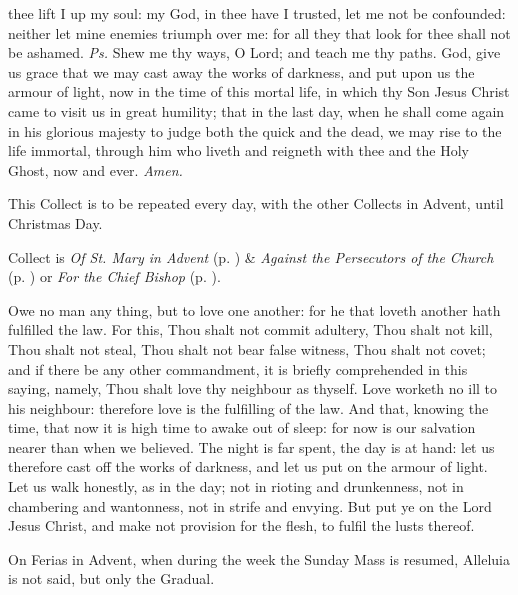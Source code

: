 \introit
{} thee lift I up my soul: my God, in thee have I trusted, let me not be confounded: neither let mine enemies triumph over me: for all they that look for thee shall not be ashamed. \textit{Ps.} Shew me thy ways, O Lord; and teach me thy paths.
\collect
{} God, give us grace that we may cast away the works of darkness, and put upon us the armour of light, now in the time of this mortal life, in which thy Son Jesus Christ came to visit us in great humility; that in the last day, when he shall come again in his glorious majesty to judge both the quick and the dead, we may rise to the life immortal, through him who liveth and reigneth with thee and the Holy Ghost, now and ever. \textit{Amen.}
\begin{rubric}
    This Collect is to be repeated every day, with the other Collects in Advent, until Christmas Day.
\end{rubric}
\begin{rubric}
     Collect is \emph{Of St. Mary in Advent} (p. \pageref{SPMaryInAdvent}) \&  \emph{Against the Persecutors of the Church} (p. \pageref{SPAgainst}) or \emph{For the Chief Bishop} (p. \pageref{SPChiefBishop}).
\end{rubric}
 Owe no man any thing, but to love one another: for he that loveth another hath fulfilled the law. For this, Thou shalt not commit adultery, Thou shalt not kill, Thou shalt not steal, Thou shalt not bear false witness, Thou shalt not covet; and if there be any other commandment, it is briefly comprehended in this saying, namely, Thou shalt love thy neighbour as thyself. Love worketh no ill to his neighbour: therefore love is the fulfilling of the law. And that, knowing the time, that now it is high time to awake out of sleep: for now is our salvation nearer than when we believed. The night is far spent, the day is at hand: let us therefore cast off the works of darkness, and let us put on the armour of light. Let us walk honestly, as in the day; not in rioting and drunkenness, not in chambering and wantonness, not in strife and envying. But put ye on the Lord Jesus Christ, and make not provision for the flesh, to fulfil the lusts thereof.
\begin{rubric}
    On Ferias in Advent, when during the week the Sunday Mass is resumed, Alleluia is not said, but only the Gradual.
\end{rubric}

